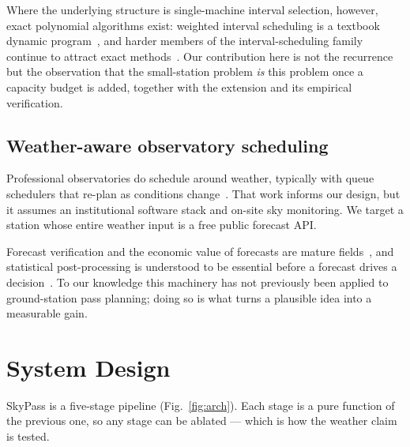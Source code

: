 \documentclass[conference]{IEEEtran}
\begin{document}
Where the underlying structure is single-machine interval selection, however,
exact polynomial algorithms exist: weighted interval scheduling is a textbook
dynamic program~\cite{cormen2022introduction}, and harder members of the
interval-scheduling family continue to attract exact
methods~\cite{muir2023interval}. Our contribution here is not the recurrence but the observation
that the small-station problem \emph{is} this problem once a capacity budget is
added, together with the extension and its empirical verification.

\subsection{Weather-aware observatory scheduling}
Professional observatories do schedule around weather, typically with
queue schedulers that re-plan as conditions
change~\cite{jones2026rubin, zhang2024grris, xie2024astrosa}. That work informs our design, but it assumes an
institutional software stack and on-site sky monitoring. We target a station
whose entire weather input is a free public forecast API.

Forecast verification and the economic value of forecasts are mature
fields~\cite{brown2021met, turner2022hrrr}, and statistical post-processing
is understood to be essential before a forecast drives a
decision~\cite{vannitsem2021postprocessing}. To our knowledge this machinery has
not previously been applied to ground-station pass planning; doing so is what
turns a plausible idea into a measurable gain.

\section{System Design}
\label{sec:design}

SkyPass is a five-stage pipeline (Fig.~\ref{fig:arch}). Each stage is a pure
function of the previous one, so any stage can be ablated --- which is how the
weather claim is tested.
\end{document}
